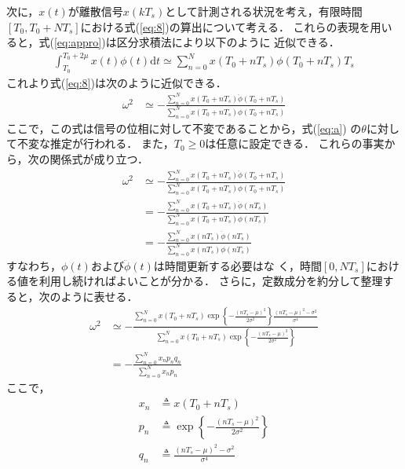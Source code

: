\documentclass[usejistfm]{sice}
\def\vec#1{\mbox{\boldmath$#1$}}
\begin{document}
次に，$x(t)$が離散信号$x(kT_s)$として計測される状況を考え，有限時間$[T_0,
T_0+NT_s]$における式(\ref{eq:8})の算出について考える．
これらの表現を用いると，式(\ref{eq:appro})は区分求積法により以下のように
近似できる．
\begin{align}
 \int^{T_0+2\mu}_{T_0}  x(t)\phi(t)\mbox{d}t  \simeq
 \sum^{N}_{n=0} x(T_0+nT_s)\phi(T_0+nT_s)T_s
\end{align}
これより式(\ref{eq:8})は次のように近似できる．
\begin{align}
\omega^2&\simeq -\frac{\sum^{N}_{n=0}
 x(T_0+nT_s)\ddot{\phi}(T_0+nT_s)}{\sum^{N}_{n=0}
 x(T_0+nT_s)\phi(T_0+nT_s)}
\end{align}
%
ここで，この式は信号の位相に対して不変であることから，式(\ref{eq:a})
の$\theta$に対して不変な推定が行われる．
また，$T_0\geq0$は任意に設定できる．
これらの事実から，次の関係式が成り立つ．
\begin{align}
\omega^2&\simeq -\frac{\sum^{N}_{n=0}
 x(T_0+nT_s)\ddot{\phi}(T_0+nT_s)}{\sum^{N}_{n=0}
 x(T_0+nT_s)\phi(T_0+nT_s)}\nonumber\\
&= -\frac{\sum^{N}_{n=0}
 x(T_0+nT_s)\ddot{\phi}(nT_s)}{\sum^{N}_{n=0}
 x(T_0+nT_s)\phi(nT_s)}\nonumber\\
&= -\frac{\sum^{N}_{n=0}
 x(nT_s)\ddot{\phi}(nT_s)}{\sum^{N}_{n=0}
 x(nT_s)\phi(nT_s)}
\label{eq:omega2}
\end{align}
すなわち，$\phi(t)$および$\ddot{\phi}(t)$は時間更新する必要はな
く，時間$[0, NT_s]$における値を利用し続ければよいことが分かる．
さらに，定数成分を約分して整理すると，次のように表せる．
\begin{align}
\omega^2&\simeq 
-\frac{\sum^{N}_{n=0}x(T_0+nT_s)
 \exp\left\{-\frac{(nT_s-\mu)^2}{2\sigma^2}\right\}\frac{(nT_s-\mu)^2-\sigma^2}{\sigma^4}}
{\sum^{N}_{n=0}x(T_0+nT_s)
 \exp\left\{-\frac{(nT_s-\mu)^2}{2\sigma^2}\right\}
 }\nonumber\\
 &= -\frac{\sum^{N}_{n=0}x_np_nq_n}{\sum^{N}_{n=0}x_np_n}
\label{eq:omega3}
\end{align}
%
ここで，
\begin{align*}
 x_n&\triangleq x(T_0+nT_s)\\
%
 p_n&\triangleq \exp\left\{-\frac{(nT_s-\mu)^2}{2\sigma^2}\right\}\\
%
 q_n&\triangleq \frac{(nT_s-\mu)^2-\sigma^2}{\sigma^4}
\end{align*}
\end{document}
